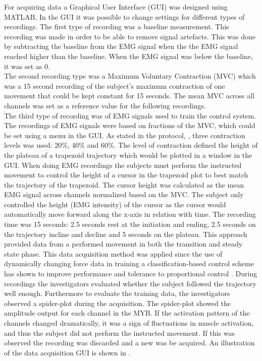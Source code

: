 For acquiring data a Graphical User Interface (GUI) was designed using MATLAB. In the GUI it was possible to change settings for different types of recordings. The first type of recording was a baseline measurement. This recording was made in order to be able to remove signal artefacts. This was done by subtracting the baseline from the EMG signal when the the EMG signal reached higher than the baseline. When the EMG signal was below the baseline, it was set as 0. \\
The second recording type was a Maximum Voluntary Contraction (MVC) which was a 15 second recording of the subject's maximum contraction of one movement that could be kept constant for 15 seconds. The mean MVC across all channels was set as a reference value for the following recordings. \\
The third type of recording was of EMG signals used to train the control system. The recordings of EMG signals were based on fractions of the MVC, which could be set using a menu in the GUI. As stated in the protocol, , three contraction levels was used: 20\%, 40\% and 60\%. The level of contraction defined the height of the plateau of a trapezoid trajectory which would be plotted in a window in the GUI. When doing EMG recordings the subjects must perform the instructed movement to control the height of a cursor in the trapezoid plot to best match the trajectory of the trapezoid. The cursor height was calculated as the mean EMG signal across channels normalized based on the MVC. The subject only controlled the height (EMG intensity) of the cursor as the cursor would automatically move forward along the x-axis in relation with time. The recording time was 15 seconds: 2.5 seconds rest at the initiation and ending, 2.5 seconds on the trajectory incline and decline and 5 seconds on the plateau. This approach provided data from a performed movement in both the transition and steady state phase. This data acquisition method was applied since the use of dynamically changing force data in training a classification-based control scheme has shown to improve performance and tolerance to proportional control \cite{Scheme2015}. 
During recordings the investigators evaluated whether the subject followed the trajectory well enough. Furthermore to evaluate the training data, the investigators observed a spider-plot during the acquisition. The spider-plot showed the amplitude output for each channel in the MYB. If the activation pattern of the channels changed dramatically, it was a sign of fluctuations in muscle activation, and thus the subject did not perform the instructed movement. If this was observed the recording was discarded and a new was be acquired. An illustration of the data acquisition GUI is shown in .

